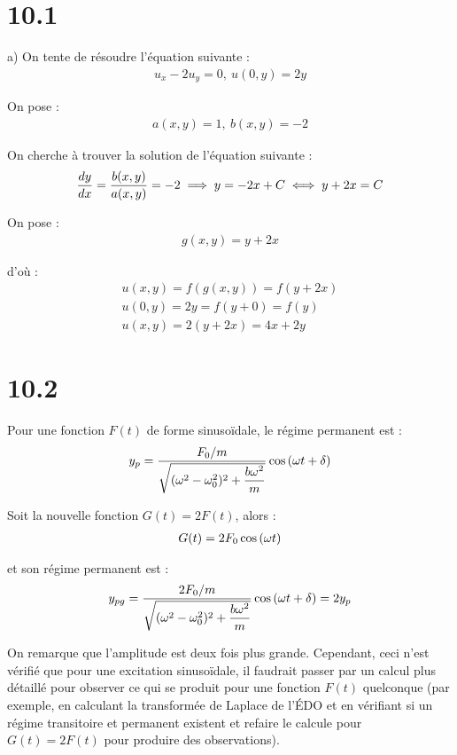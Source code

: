 \section*{10.1}

a) On tente de résoudre l'équation suivante :
\begin{align*}
    u_x -2u_y = 0,\ u(0,y) = 2y
\end{align*}

On pose :
\begin{align*}
    a(x,y) = 1,\ b(x,y) = -2
\end{align*}

On cherche à trouver la solution de l'équation suivante :
\begin{align*}
    \dfrac{d y}{d x} = \dfrac{b(x,y)}{a(x,y)} = -2 \implies y = -2x +C \iff y + 2x = C
\end{align*}

On pose :
\begin{align*}
    g(x,y) = y+2x
\end{align*}

d'où :
\begin{gather*}
    u(x,y) = f(g(x,y)) = f(y+2x)\\
    u(0,y) = 2y = f(y + 0) = f(y)\\
    u(x,y) = 2(y+2x) = 4x+2y
\end{gather*}

\section*{10.2}

Pour une fonction $F(t)$ de forme sinusoïdale, le régime permanent est :
\begin{align*}
    y_p = \dfrac{F_0/m}{\sqrt{(\omega^2 -\omega_0^2)^2 +\dfrac{b\omega^2}{m}}}
    \cos\left({\omega t + \delta}\right)
\end{align*}

Soit la nouvelle fonction $G(t) = 2F(t)$, alors :
\begin{align*}
    G(t) = 2F_0 \cos\left({\omega t}\right)
\end{align*}

et son régime permanent est :
\begin{align*}
    y_{pg} = \dfrac{2F_0/m}{\sqrt{(\omega^2 -\omega_0^2)^2 +\dfrac{b\omega^2}{m}}}
    \cos\left({\omega t + \delta}\right) = 2y_p
\end{align*}

On remarque que l'amplitude est deux fois plus grande. Cependant, ceci n'est
vérifié que pour une excitation sinusoïdale, il faudrait passer par un calcul
plus détaillé pour observer ce qui se produit pour une fonction $F(t)$
quelconque (par exemple, en calculant la transformée de Laplace de l'ÉDO et
en vérifiant si un régime transitoire et permanent existent et refaire le
calcule pour $G(t) = 2F(t)$ pour produire des observations).
